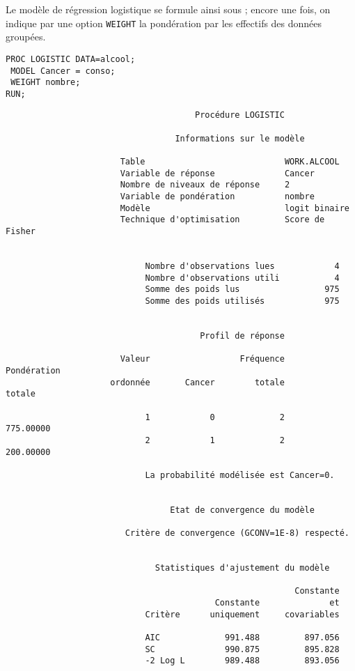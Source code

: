Le modèle de régression logistique se formule ainsi sous \SAS ; encore une
fois, on indique par une option \texttt{WEIGHT} la pondération par les
effectifs des données groupées.
\begin{verbatim}
PROC LOGISTIC DATA=alcool;
 MODEL Cancer = conso;
 WEIGHT nombre;
RUN;
\end{verbatim}

\begin{verbatim}
                                      Procédure LOGISTIC

                                  Informations sur le modèle

                       Table                            WORK.ALCOOL
                       Variable de réponse              Cancer
                       Nombre de niveaux de réponse     2
                       Variable de pondération          nombre
                       Modèle                           logit binaire
                       Technique d'optimisation         Score de Fisher


                            Nombre d'observations lues            4
                            Nombre d'observations utili           4
                            Somme des poids lus                 975
                            Somme des poids utilisés            975


                                       Profil de réponse

                       Valeur                  Fréquence      Pondération
                     ordonnée       Cancer        totale           totale

                            1            0             2        775.00000
                            2            1             2        200.00000

                            La probabilité modélisée est Cancer=0.


                                 Etat de convergence du modèle

                        Critère de convergence (GCONV=1E-8) respecté.


                              Statistiques d'ajustement du modèle

                                                          Constante
                                          Constante              et
                            Critère      uniquement     covariables

                            AIC             991.488         897.056
                            SC              990.875         895.828
                            -2 Log L        989.488         893.056



\end{verbatim}
